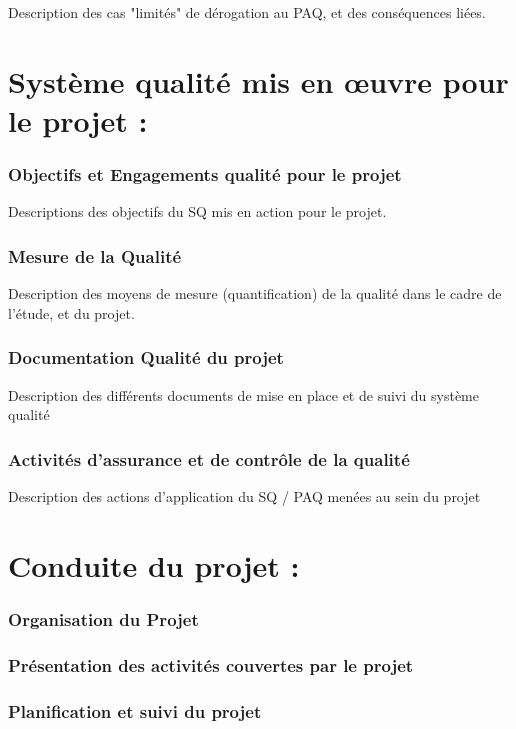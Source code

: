 \documentclass[a4paper, 18pt]{article}
\begin{document}
Description des cas "limités" de dérogation au PAQ, et des conséquences liées.

\part{Système qualité mis en œuvre pour le projet :}

\section{Objectifs et Engagements qualité pour le projet}

Descriptions des objectifs du SQ mis en action pour le projet.

\section{Mesure de la Qualité}

Description des moyens de mesure (quantification) de la qualité dans le cadre de l'étude, et du projet.

\section{Documentation Qualité du projet}

Description des différents documents de mise en place et de suivi du système qualité

\section{Activités d'assurance et de contrôle de la qualité }

Description des actions d'application du SQ / PAQ menées au sein du projet 

\part{Conduite du projet : }

\section{Organisation du Projet }

\section{Présentation des activités couvertes par le projet }

\section{Planification et suivi du projet }
\end{document}
